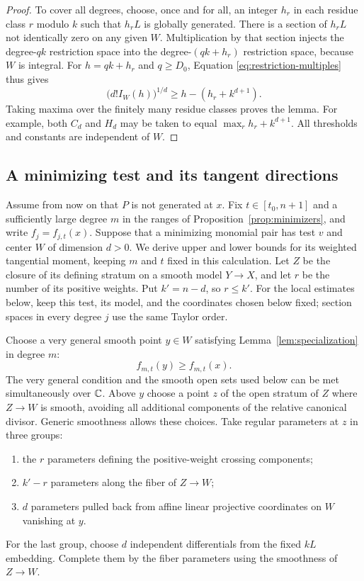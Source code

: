 \begin{proof}
To cover all degrees, choose, once and for all, an integer $h_r$ in each
residue class $r$ modulo $k$ such that $h_rL$ is globally generated.
There is a section of $h_rL$ not identically zero on any given $W$.
Multiplication by that section injects the degree-$qk$ restriction space
into the degree-$(qk+h_r)$ restriction space, because $W$ is integral.
For $h=qk+h_r$ and $q\ge D_0$, Equation
\eqref{eq:restriction-multiples} thus gives
\[
 \bigl(d!I_W(h)\bigr)^{1/d}
 \ge h-(h_r+k^{d+1}).
\]
Taking maxima over the finitely many residue classes proves the lemma.
For example, both $C_d$ and $H_d$ may be taken to equal
$\max_r h_r+k^{d+1}$. All thresholds and constants are independent
of $W$.
\end{proof}

\subsection{A minimizing test and its tangent directions}

Assume from now on that $P$ is not generated at $x$.
Fix $t\in[t_0,n+1]$ and a sufficiently large degree $m$ in the ranges
of Proposition~\ref{prop:minimizers}, and write $f_j=f_{j,t}(x)$.
Suppose that a minimizing monomial pair has test $v$ and center $W$
of dimension $d>0$. We derive upper and lower bounds for its weighted
tangential moment, keeping $m$ and $t$ fixed in this calculation.
Let $Z$ be the closure of its defining stratum on
a smooth model $Y\to X$, and let $r$ be the number of its positive
weights. Put $k'=n-d$, so $r\le k'$. For the local estimates below,
keep this test, its model, and the coordinates chosen below fixed; section spaces in
every degree $j$ use the same Taylor order.

Choose a very general smooth point $y\in W$ satisfying
Lemma~\ref{lem:specialization} in degree $m$:
\begin{equation}\label{eq:center-specialization}
 f_{m,t}(y)\ge f_{m,t}(x).
\end{equation}
The very general condition and the smooth open sets used below can be
met simultaneously over $\mathbb C$. Above $y$ choose a
point $z$ of the open stratum of $Z$ where $Z\to W$ is smooth, avoiding
all additional components of the relative canonical divisor. Generic
smoothness allows these choices. Take regular parameters at $z$ in
three groups:
\begin{enumerate}
 \item the $r$ parameters defining the positive-weight crossing
 components;
 \item $k'-r$ parameters along the fiber of $Z\to W$;
 \item $d$ parameters pulled back from affine linear projective
 coordinates on $W$ vanishing at $y$.
\end{enumerate}
For the last group, choose $d$ independent differentials from the fixed
$kL$ embedding. Complete them by the fiber parameters using the
smoothness of $Z\to W$.

